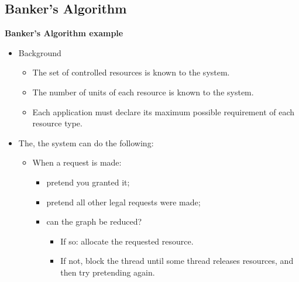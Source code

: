 \documentclass[11pt,a4paper]{article}
\begin{document}
\subsection{Banker's Algorithm}

\textbf{Banker's Algorithm example}
\begin{itemize}
    \item Background
        \begin{itemize}
            \item The set of controlled resources is known to the system.
            \item The number of units of each resource is known to the system.
            \item Each application must declare its maximum possible requirement of each
                resource type.
        \end{itemize}
    \item The, the system can do the following:
        \begin{itemize}
            \item When a request is made:
                \begin{itemize}
                    \item pretend you granted it;
                    \item pretend all other legal requests were made;
                    \item can the graph be reduced?
                        \begin{itemize}
                            \item If so: allocate the requested resource.
                            \item If not, block the thread until some thread releases resources,
                                and then try pretending again.
                        \end{itemize}
                \end{itemize}
        \end{itemize}
\end{itemize}
\end{document}
